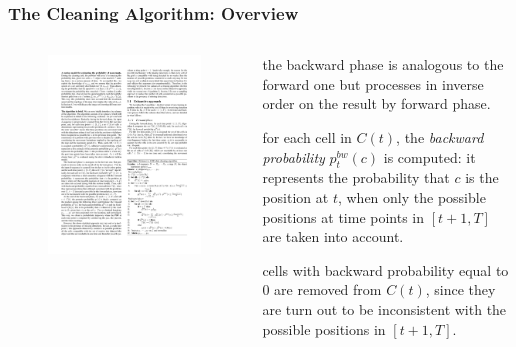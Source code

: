 
\begin{frame}
\frametitle{The Cleaning Algorithm: Overview}

\begin{columns}

  \begin{figure}[tb]
    \includegraphics[width=\columnwidth]{figures/3-4/3-4-16.pdf}
  \end{figure}

  \begin{sitemize}
    \item the backward phase is analogous to the forward one but processes in inverse order on the result by forward phase.
    \item for each cell in $C(t)$, the \emph{backward probability} $p^{bw}_t(c)$ is computed: it represents the probability that $c$ is the position at $t$, when only the possible positions at time points in $[t+1,T]$ are taken into account.
    \item cells with backward probability equal to $0$ are removed from $C(t)$, since they are turn out to be inconsistent with the possible positions in $[t+1,T]$.
  \end{sitemize}

\end{columns}

\end{frame}

